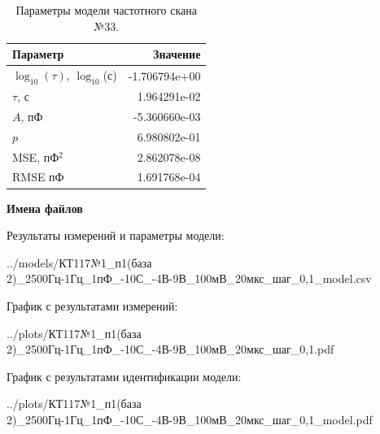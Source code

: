 \begin{table}[!ht]
    \centering
    \caption{Параметры модели частотного скана №33.}
    \begin{tabular}{|l|r|}
        \hline
        Параметр                                       & Значение                  \\ \hline
        $\log_{10}(\tau)$, $\log_{10}$(с)              & -1.706794e+00             \\ \hline
        $\tau$, с                                      & 1.964291e-02              \\ \hline
        $A$, пФ                                        & -5.360660e-03             \\ \hline
        $p$                                            & 6.980802e-01              \\ \hline
        MSE, пФ$^2$                                    & 2.862078e-08              \\ \hline
        RMSE пФ                                        & 1.691768e-04              \\ \hline
    \end{tabular}
    \label{table:frequency_scan_model_33}
\end{table}

\textbf{Имена файлов}

Результаты измерений и параметры модели:

\scriptsize../models/КТ117№1\_п1(база 2)\_2500Гц-1Гц\_1пФ\_-10С\_-4В-9В\_100мВ\_20мкс\_шаг\_0,1\_model.csv
\normalsize

График с результатами измерений:

\scriptsize../plots/КТ117№1\_п1(база 2)\_2500Гц-1Гц\_1пФ\_-10С\_-4В-9В\_100мВ\_20мкс\_шаг\_0,1.pdf
\normalsize

График с результатами идентификации модели:

\scriptsize../plots/КТ117№1\_п1(база 2)\_2500Гц-1Гц\_1пФ\_-10С\_-4В-9В\_100мВ\_20мкс\_шаг\_0,1\_model.pdf
\normalsize

